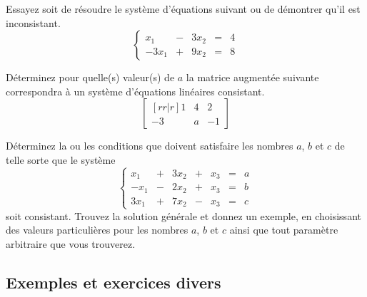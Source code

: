 \begin{exerciceC}
	Essayez soit de résoudre le système d'équations suivant ou de démontrer qu'il est inconsistant.
	\[
	\left\{
	\begin{matrix}
	x_1 &-& 3x_2  &=& 4 \\
	-3x_1 &+& 9x_2  &=& 8
	\end{matrix}\right.
	\]
\end{exerciceC}

\begin{exerciceC}
	Déterminez pour quelle(s) valeur(s) de $a$ la matrice augmentée suivante correspondra
	à un système d'équations linéaires consistant.
	\[
	\begin{bmatrix}[rr|r]
	1 & 4 & 2 \\
	-3 & a & -1
	\end{bmatrix}
	\]
\end{exerciceC}
\begin{exerciceB}
	Déterminez la ou les conditions que doivent satisfaire les nombres $a$, $b$ et $c$ de telle sorte
	que le système
	\[
	\left\{\begin{matrix}
	x_1 &+& 3x_2 &+& x_3 &=& a\\
	-x_1 &-& 2x_2 &+& x_3 &=& b \\
	3x_1 &+& 7x_2 &-& x_3 &=& c
	\end{matrix}
	\right.
	\]
	soit consistant.  Trouvez la solution générale et donnez un exemple, en choisissant des valeurs
	particulières pour les nombres $a$, $b$ et $c$ ainsi que tout paramètre arbitraire que vous
	trouverez.
\end{exerciceB}


\subsection{Exemples et exercices divers}


